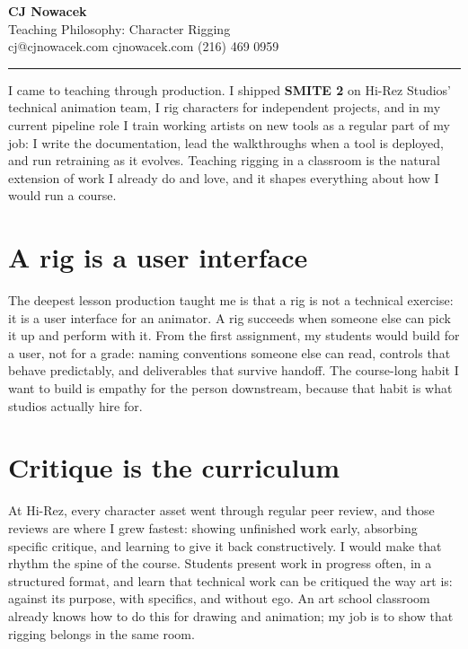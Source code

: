\documentclass[10pt,a4paper]{article}
\begin{document}
{\huge\bfseries CJ Nowacek}\\[2pt]
{\large\color{accent} Teaching Philosophy: Character Rigging}\\[2pt]
{\small cj@cjnowacek.com \textbullet{} cjnowacek.com \textbullet{} (216) 469 0959}

\vspace{6pt}
\hrule
\vspace{4pt}

I came to teaching through production. I shipped \textbf{SMITE 2} on Hi-Rez Studios' technical animation team, I rig characters for independent projects, and in my current pipeline role I train working artists on new tools as a regular part of my job: I write the documentation, lead the walkthroughs when a tool is deployed, and run retraining as it evolves. Teaching rigging in a classroom is the natural extension of work I already do and love, and it shapes everything about how I would run a course.

\section{A rig is a user interface}
The deepest lesson production taught me is that a rig is not a technical exercise: it is a user interface for an animator. A rig succeeds when someone else can pick it up and perform with it. From the first assignment, my students would build for a user, not for a grade: naming conventions someone else can read, controls that behave predictably, and deliverables that survive handoff. The course-long habit I want to build is empathy for the person downstream, because that habit is what studios actually hire for.

\section{Critique is the curriculum}
At Hi-Rez, every character asset went through regular peer review, and those reviews are where I grew fastest: showing unfinished work early, absorbing specific critique, and learning to give it back constructively. I would make that rhythm the spine of the course. Students present work in progress often, in a structured format, and learn that technical work can be critiqued the way art is: against its purpose, with specifics, and without ego. An art school classroom already knows how to do this for drawing and animation; my job is to show that rigging belongs in the same room.
\end{document}
